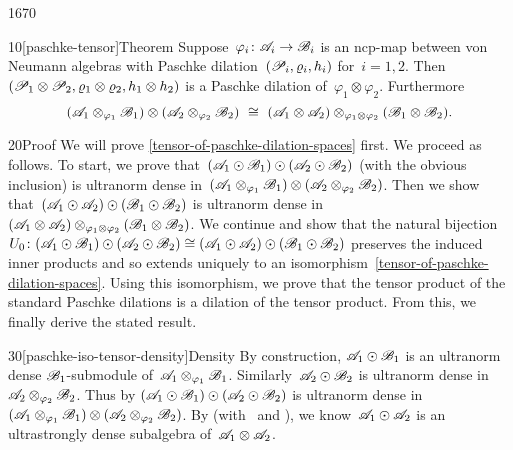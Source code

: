\begin{parsec}{1670}%
\begin{point}{10}[paschke-tensor]{Theorem}%
Suppose~$\varphi_i \colon \mathscr{A}_i \to \mathscr{B}_i$
    is an ncp-map between von Neumann algebras
    with Paschke dilation~$(\mathscr{P}_i, \varrho_i, h_i)$
    for~$i=1,2$.
Then~$(\mathscr{P}_1 \otimes \mathscr{P}_2, \varrho_1 \otimes \varrho_2, h_1\otimes h_2)$
    is a Paschke dilation of~$\varphi_1 \otimes \varphi_2$.
    Furthermore
\begin{equation}\label{tensor-of-paschke-dilation-spaces}
(\scrA_1 \otimes_{\varphi_1} \scrB_1)
\otimes (\scrA_2 \otimes_{\varphi_2} \scrB_2)
\ \cong \ 
(\scrA_1 \otimes \scrA_2) \otimes_{\varphi_1\otimes \varphi_2} (\scrB_1 \otimes \scrB_2).
\end{equation}
\begin{point}{20}{Proof}%
We will prove \eqref{tensor-of-paschke-dilation-spaces} first.
We proceed as follows.
To start, we prove that~$
(\mathscr{A}_1 \odot \mathscr{B}_1) \odot (\mathscr{A}_2 \odot \mathscr{B}_2)$
    (with the obvious inclusion)
    is ultranorm dense in~$(\mathscr{A}_1 \otimes_{\varphi_1} \mathscr{B}_1)
\otimes (\mathscr{A}_2 \otimes_{\varphi_2} \mathscr{B}_2)$.
Then we show that~$
(\mathscr{A}_1 \odot \mathscr{A}_2) \odot (\mathscr{B}_1 \odot \mathscr{B}_2) $
is ultranorm dense in~$
(\mathscr{A}_1 \otimes \mathscr{A}_2) \otimes_{\varphi_1\otimes \varphi_2} (\mathscr{B}_1 \otimes \mathscr{B}_2)$.
We continue and show that the natural bijection
$U_0\colon (\mathscr{A}_1 \odot \mathscr{B}_1) \odot (\mathscr{A}_2 \odot \mathscr{B}_2) \cong
(\mathscr{A}_1 \odot \mathscr{A}_2) \odot (\mathscr{B}_1 \odot \mathscr{B}_2) $
preserves the induced inner products and
    so extends uniquely to an
    isomorphism~\eqref{tensor-of-paschke-dilation-spaces}.
Using this isomorphism,
    we prove that the tensor product of the standard Paschke dilations
    is a dilation of the tensor product.
    From this, we finally derive the stated result.
\begin{point}{30}[paschke-iso-tensor-density]{Density}%
By construction, $\mathscr{A}_1 \odot \mathscr{B}_1$ is an ultranorm dense
        $\mathscr{B}_1$-submodule
    of~$\mathscr{A}_1 \otimes_{\varphi_1} \mathscr{B}_1$.
Similarly~$\mathscr{A}_2 \odot \mathscr{B}_2 $ is ultranorm dense
    in~$\mathscr{A}_2 \otimes_{\varphi_2} \mathscr{B}_2$.
Thus by 
    $(\mathscr{A}_1 \odot \mathscr{B}_1) \odot(
    \mathscr{A}_2 \odot \mathscr{B}_2) $ is ultranorm dense in~$(\mathscr{A}_1 \otimes_{\varphi_1} \mathscr{B}_1)
\otimes (\mathscr{A}_2 \otimes_{\varphi_2} \mathscr{B}_2)$.
By 
        (with~ and ),
    we know~$\mathscr{A}_1 \odot \mathscr{A}_2$
    is an ultrastrongly dense subalgebra
    of~$\mathscr{A}_1 \otimes \mathscr{A}_2$.

\end{point}
\end{point}
\end{point}
\end{parsec}
